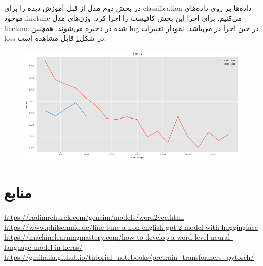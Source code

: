 \documentclass[10pt]{article}
\begin{document}
\subsection{}
در بخش دوم مدل 
از قبل آموزش دیده را برای classification داده‌ها بر روی داده‌های موجود finetune می‌کنیم. 
برای اجرا این بخش کافیست
را اجرا کرد. وزن‌های مدل finetune شده در 
ذخیره می‌شوند. همچنین log در حین اجرا در 
می‌باشد. نمودار تغییرات loss در شکل\ref{bert}
قابل مشاهده است.

\begin{figure}[ht!]
	\centering\includegraphics[width=\linewidth]{../reports/loss_history_Bert.png}
	\caption{ 
		}
	\label{bert}
\end{figure}


\newpage

\section{منابع}

\begin{flushleft}
	\url{https://radimrehurek.com/gensim/models/word2vec.html}
	\url{https://www.philschmid.de/fine-tune-a-non-english-gpt-2-model-with-huggingface}
	\url{https://machinelearningmastery.com/how-to-develop-a-word-level-neural-language-model-in-keras/}
	\url{https://gmihaila.github.io/tutorial_notebooks/pretrain_transformers_pytorch/}
\end{flushleft}
\end{document}
